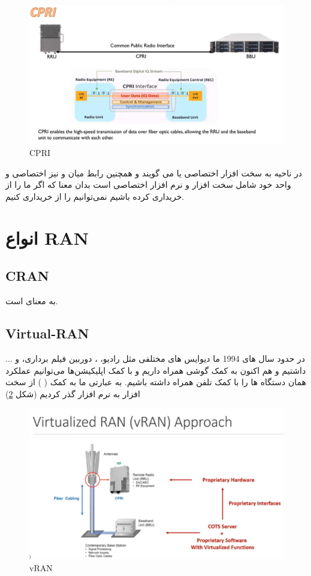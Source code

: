 \documentclass[landscape, 12pt]{report}
\begin{document}
\begin{figure}[ht]
	\centering
	\includegraphics[width=.6\linewidth]{Pic/CPRI}
	\caption{CPRI}
	\label{fig:CPRI}
\end{figure}

در ناحیه
  به
    سخت افزار اختصاصی یا
      می گویند و همچنین رابط میان
         و
           نیز اختصاصی و واحد
             خود شامل سخت افزار و نرم افزار اختصاصی است بدان معنا که اگر ما
               را از
                 خریداری کرده باشیم نمی‌توانیم
                   را از
                     خریداری کنیم.
                     
\chapter*{انواع 
RAN
}

\section*{CRAN}
به معنای
  است.
\section*{Virtual-RAN}                    
در حدود سال های 1994 ما دیوایس های مختلفی مثل رادیو،
 ، دوربین فیلم برداری،
   و ... داشتیم و هم اکنون به کمک
    گوشی همراه داریم و با کمک اپلیکیشن‌ها می‌توانیم عملکرد همان دستگاه ها را با کمک تلفن همراه داشته باشیم. به عبارتی ما به کمک
      ( 
    ) از سخت افزار به نرم افزار گذر کردیم (شکل \ref{fig:vRAN})
    \begin{figure}[ht]
    	\centering
    	\includegraphics[width=.6\linewidth]{Pic/vRAN}
    	\caption{vRAN}
    	\label{fig:vRAN}
    \end{figure}
    
\end{document}
